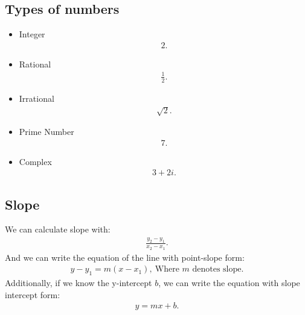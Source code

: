 \documentclass{report}
\begin{document}
    \subsection{Types of numbers}
    \begin{itemize}
        \item Integer
            \begin{align*}
                2
            .\end{align*}
        \item Rational
            \begin{align*}
                \frac{1}{2}
            .\end{align*}
        \item Irrational
            \begin{align*}
                \sqrt{2}
            .\end{align*}
        \item Prime Number
            \begin{align*}
                7
            .\end{align*}
        \item Complex
            \begin{align*}
                3+2i
            .\end{align*}
    \end{itemize}
     \bigbreak \noindent 
     \subsection{Slope}
     We can calculate slope with:
     \begin{align*}
       \frac{y_{2} - y_{1}}{x_{2} - x_{1}}
     .\end{align*}
     \bigbreak \noindent \bigbreak \noindent 
     And we can write the equation of the line with point-slope form:
     \bigbreak \noindent 
     \begin{align*}
       y- y_{1} = m(x-x_{1}),\ \text{Where $m$ denotes slope} 
     .\end{align*}
     \bigbreak \noindent \bigbreak \noindent 
     Additionally, if we know the y-intercept $b$, we can write the equation with slope intercept form:
     \begin{align*}
       y = mx+b
     .\end{align*}
    \bigbreak \noindent \bigbreak \noindent 
\end{document}
